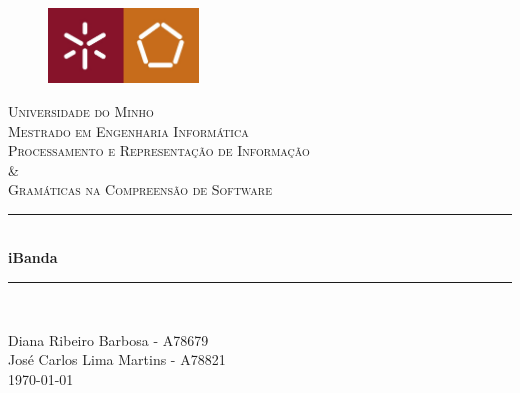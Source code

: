 \begin{titlepage}
    \center
    \begin{figure}[H]
        \centering
        \includegraphics[width=4cm]{imgs/UM_EENG.jpg}
    \end{figure}
    \textsc{\LARGE Universidade do Minho} \\ [1.5cm]
    \textsc{\Large Mestrado em Engenharia Informática} \\ [0.5cm]
    \textsc{\large Processamento e Representação de Informação\\ \& \\Gramáticas na Compreensão de Software} \\ [0.5cm]
    
    \vspace*{1cm}
    
    \rule{\linewidth}{0.5mm} \\ [0.25cm]
    {\huge \bfseries iBanda}
    \rule{\linewidth}{0.5mm} \\ [0.25cm]
    
    \vspace*{1cm}

    Diana Ribeiro Barbosa - A78679 \\
    José Carlos Lima Martins - A78821 \\ [0.25cm]

    \today
\end{titlepage}